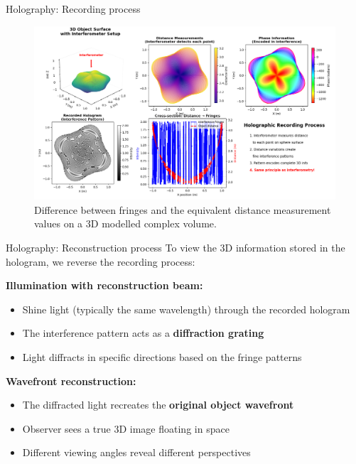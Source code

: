\documentclass{beamer}
\begin{document}
\begin{frame}{Holography: Recording process}
    \begin{figure}[h]
        \centering
        \includegraphics[width=1\textwidth]{Figures/sphere-fringe-distances.png}
        \caption{Difference between fringes and the equivalent distance measurement values on a 3D modelled complex volume.}
        \label{fig:sphere_fringes}
    \end{figure}
\end{frame}
\begin{frame}{Holography: Reconstruction process}
    To view the 3D information stored in the hologram, we reverse the recording process:
    
    \vspace{0.5em}
    
    \textbf{Illumination with reconstruction beam:}
    \begin{itemize}
        \item Shine light (typically the same wavelength) through the recorded hologram
        \item The interference pattern acts as a \textbf{diffraction grating}
        \item Light diffracts in specific directions based on the fringe patterns
    \end{itemize}
    
    \vspace{0.5em}
    
    \textbf{Wavefront reconstruction:}
    \begin{itemize}
        \item The diffracted light recreates the \textbf{original object wavefront}
        \item Observer sees a true 3D image floating in space
        \item Different viewing angles reveal different perspectives    \end{itemize}
\end{frame}
\end{document}
